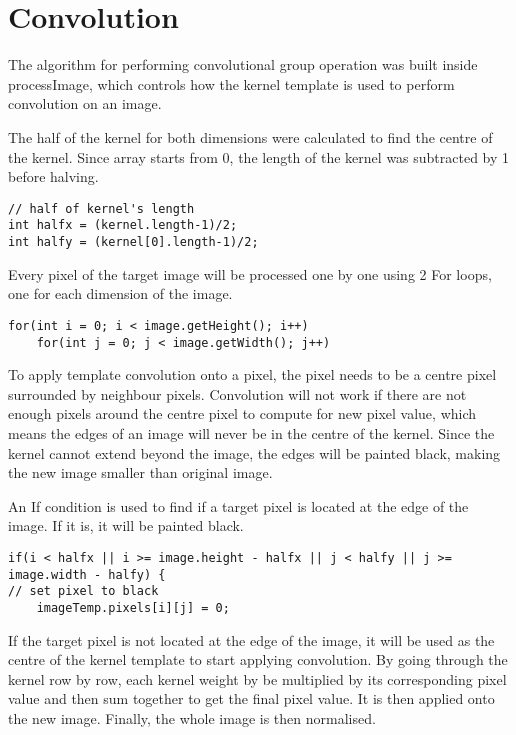 \documentclass[journal]{IEEEtran}
\begin{document}
\section{Convolution}

The algorithm for performing convolutional group operation was built inside processImage, which controls how the kernel template is used to perform convolution on an image.

The half of the kernel for both dimensions were calculated to find the centre of the kernel. Since array starts from 0, the length of the kernel was subtracted by 1 before halving.

\begin{lstlisting}
// half of kernel's length
int halfx = (kernel.length-1)/2;
int halfy = (kernel[0].length-1)/2;
\end{lstlisting}

Every pixel of the target image will be processed one by one using 2 For loops, one for each dimension of the image.

\begin{lstlisting}
for(int i = 0; i < image.getHeight(); i++)
	for(int j = 0; j < image.getWidth(); j++)
\end{lstlisting}

To apply template convolution onto a pixel, the pixel needs to be a centre pixel surrounded by neighbour pixels. Convolution will not work if there are not enough pixels around the centre pixel to compute for new pixel value, which means the edges of an image will never be in the centre of the kernel. Since the kernel cannot extend beyond the image, the edges will be painted black, making the new image smaller than original image.

An If condition is used to find if a target pixel is located at the edge of the image. If it is, it will be painted black.

\begin{lstlisting}
if(i < halfx || i >= image.height - halfx || j < halfy || j >= image.width - halfy) {
// set pixel to black
    imageTemp.pixels[i][j] = 0;
\end{lstlisting}

If the target pixel is not located at the edge of the image, it will be used as the centre of the kernel template to start applying convolution. By going through the kernel row by row, each kernel weight by be multiplied by its corresponding pixel value and then sum together to get the final pixel value. It is then applied onto the new image. Finally, the whole image is then normalised.
\end{document}
